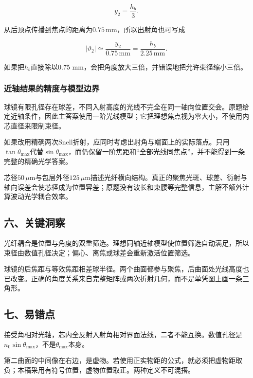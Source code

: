 \documentclass[12pt,a4paper,fontset=fandol]{ctexart}
\begin{document}
\[
y_2=\frac{h_b}{3}.
\]

从后顶点传播到焦点的距离为\(0.75\,\mathrm{mm}\)，所以出射角也可写成

\[
|\vartheta_2|
\simeq\frac{y_2}{0.75\,\mathrm{mm}}
=\frac{h_b}{2.25\,\mathrm{mm}}.
\]

如果把\(h_b\)直接除以0.75
mm，会把角度放大三倍，并错误地把允许束径缩小三倍。

\subsubsection{近轴结果的精度与模型边界}\label{ux8fd1ux8f74ux7ed3ux679cux7684ux7cbeux5ea6ux4e0eux6a21ux578bux8fb9ux754c}

球镜有限孔径存在球差，不同入射高度的光线不完全在同一轴向位置交会。原题给定近轴条件，因此主答案使用一阶光线模型；它把理想焦点视为零大小，不使用内芯直径来限制束径。

如果改用精确两次Snell折射，应同时考虑出射角与端面上的实际落点。只用\(\tan\theta_{\max}\)代替\(\sin\theta_{\max}\)，而仍保留一阶焦距和``全部光线同焦点''，并不能得到一条完整的精确光学答案。

芯径\(50\,\mu\mathrm m\)与包层外径\(125\,\mu\mathrm m\)描述光纤横向结构。真正的聚焦光斑、球差、衍射与轴向误差会使芯径成为位置容差；原题没有波长和束腰等完整信息，主解不额外计算波动光学耦合效率。

\subsection{六、关键洞察}\label{ux516dux5173ux952eux6d1eux5bdf-4}

光纤耦合是位置与角度的双重筛选。理想同轴近轴模型使位置筛选自动满足，所以束径由数值孔径决定；偏心、离焦或球差会重新激活位置筛选。

球镜的后焦距与等效焦距相差球半径。两个曲面都参与聚焦，后曲面处光线高度也已改变。正确的角度关系来自完整矩阵或两次折射几何，而不是单凭图上画一条三角形。

\subsection{七、易错点}\label{ux4e03ux6613ux9519ux70b9-4}

接受角相对光轴，芯内全反射入射角相对界面法线，二者不能互换。数值孔径是\(n_0\sin\theta_{\max}\)，不是\(\theta_{\max}\)本身。

第二曲面的中间像在右边，是虚物。若使用正实物距的公式，就必须把虚物距取负；本稿采用有符号位置，虚物位置取正。两种定义不可混搭。
\end{document}

